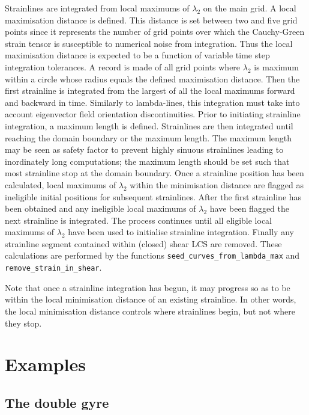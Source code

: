 \documentclass{article}
\begin{document}
Strainlines are integrated from local maximums of $\lambda_2$ on the main grid. A local maximisation distance is defined. This distance is set between two and five grid points since it represents the number of grid points over which the Cauchy-Green strain tensor is susceptible to numerical noise from integration. Thus the local maximisation distance is expected to be a function of variable time step integration tolerances. A record is made of all grid points where $\lambda_2$ is maximum within a circle whose radius equals the defined maximisation distance. Then the first strainline is integrated from the largest of all the local maximums forward and backward in time. Similarly to lambda-lines, this integration must take into account eigenvector field orientation discontinuities. Prior to initiating strainline integration, a maximum length is defined. Strainlines are then integrated until reaching the domain boundary or the maximum length. The maximum length may be seen as safety factor to prevent highly sinuous strainlines leading to inordinately long computations; the maximum length should be set such that most strainline stop at the domain boundary. Once a strainline position has been calculated, local maximums of $\lambda_2$ within the minimisation distance are flagged as ineligible initial positions for subsequent strainlines. After the first strainline has been obtained and any ineligible local maximums of $\lambda_2$ have been flagged the next strainline is integrated. The process continues until all eligible local maximums of $\lambda_2$ have been used to initialise strainline integration. Finally any strainline segment contained within (closed) shear LCS are removed. These calculations are performed by the functions \lstinline!seed_curves_from_lambda_max! and \lstinline!remove_strain_in_shear!.

Note that once a strainline integration has begun, it may progress so as to be within the local minimisation distance of an existing strainline. In other words, the local minimisation distance controls where strainlines begin, but not where they stop.

\clearpage

\section{Examples}

\subsection{The double gyre}
\end{document}
